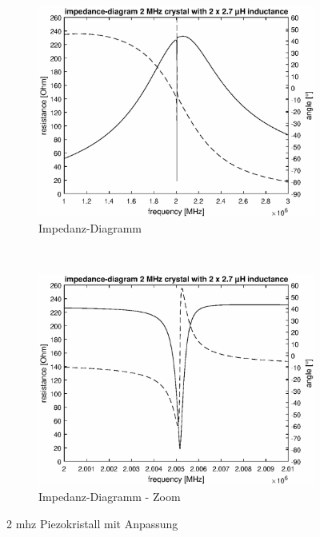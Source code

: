 \begin{figure}[h!]
	\centering
         ~ %
        \begin{subfigure}[t]{0.48\textwidth}
        	 \includegraphics[width=1\textwidth]{images/Ultrasound/zoom_out_with.eps}
	    		\caption{Impedanz-Diagramm}
	    		\label{fig:imp_2mhz_with}
        \end{subfigure}	
         ~ %
        \begin{subfigure}[t]{0.48\textwidth}
        	 \includegraphics[width=1\textwidth]{images/Ultrasound/zoom_in_with.eps}
	    		\caption{Impedanz-Diagramm - Zoom}
	    		\label{fig:imp_2mhz_with}
        \end{subfigure}	
	\caption{2 \acs{mhz} Piezokristall mit Anpassung}
	\label{fig:imp_2mhz_with}
\end{figure}\\
